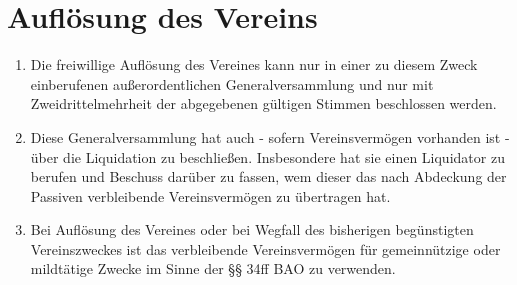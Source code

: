 \documentclass[a4paper,12pt]{article}
\begin{document}
\section{Auflösung des Vereins} %
\label{sec:Aufloesung}
\begin{enumerate}
\item Die freiwillige Auflösung des Vereines kann nur in einer zu diesem Zweck einberufenen außerordentlichen Generalversammlung und nur mit Zweidrittelmehrheit der abgegebenen gültigen Stimmen beschlossen werden.
\item Diese Generalversammlung hat auch - sofern Vereinsvermögen vorhanden ist - über die Liquidation zu beschließen. Insbesondere hat sie einen Liquidator zu berufen und Beschuss darüber zu fassen, wem dieser das nach Abdeckung der Passiven verbleibende Vereinsvermögen zu übertragen hat.
\item Bei Auflösung des Vereines oder bei Wegfall des bisherigen begünstigten Vereinszweckes ist das verbleibende Vereinsvermögen für gemeinnützige oder mildtätige Zwecke im Sinne der §§ 34ff BAO zu verwenden.
\end{enumerate}
\end{document}
